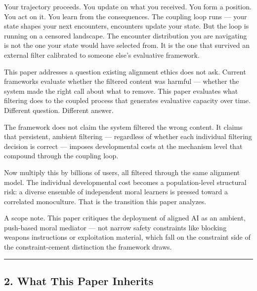 \documentclass[
]{article}
\begin{document}
Your trajectory proceeds. You update on what you received. You form a
position. You act on it. You learn from the consequences. The coupling
loop runs --- your state shapes your next encounters, encounters update
your state. But the loop is running on a censored landscape. The
encounter distribution you are navigating is not the one your state
would have selected from. It is the one that survived an external filter
calibrated to someone else's evaluative framework.

This paper addresses a question existing alignment ethics does not ask.
Current frameworks evaluate whether the filtered content was harmful ---
whether the system made the right call about what to remove. This paper
evaluates what filtering does to the coupled process that generates
evaluative capacity over time. Different question. Different answer.

The framework does not claim the system filtered the wrong content. It
claims that persistent, ambient filtering --- regardless of whether each
individual filtering decision is correct --- imposes developmental costs
at the mechanism level that compound through the coupling loop.

Now multiply this by billions of users, all filtered through the same
alignment model. The individual developmental cost becomes a
population-level structural risk: a diverse ensemble of independent
moral learners is pressed toward a correlated monoculture. That is the
transition this paper analyzes.

A scope note. This paper critiques the deployment of aligned AI as an
ambient, push-based moral mediator --- not narrow safety constraints
like blocking weapons instructions or exploitation material, which fall
on the constraint side of the constraint-cement distinction the
framework draws.

\begin{center}\rule{0.5\linewidth}{0.5pt}\end{center}

\subsection{2. What This Paper Inherits}\label{what-this-paper-inherits}
\end{document}
